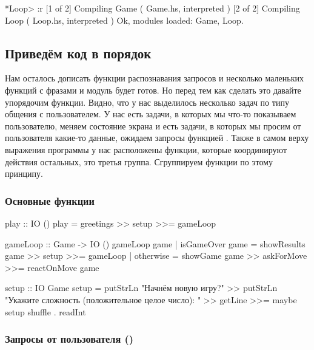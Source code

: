 \begin{code}
*Loop> :r
[1 of 2] Compiling Game             ( Game.hs, interpreted )
[2 of 2] Compiling Loop             ( Loop.hs, interpreted )
Ok, modules loaded: Game, Loop.
\end{code}

\subsection{Приведём код в порядок}

Нам осталось дописать функции распознавания запросов и несколько
маленьких функций с фразами и модуль  будет готов. Но перед тем
как сделать это давайте упорядочим функции. Видно, что у нас выделилось
несколько задач по типу общения с пользователем. У нас есть задачи, в
которых мы что-то показываем пользователю, меняем состояние экрана и
есть задачи, в которых мы просим от пользователя какие-то данные,
ожидаем запросы функцией . Также в самом верху выражения
программы у нас расположены функции, которые координируют действия
остальных, это третья группа. Сгруппируем функции по этому принципу.

\subsubsection{Основные функции}


\begin{code}
play :: IO ()
play = greetings >> setup >>= gameLoop

gameLoop :: Game -> IO ()
gameLoop game 
    | isGameOver game   = showResults game >> setup >>= gameLoop
    | otherwise         = showGame game >> askForMove >>= reactOnMove game

setup :: IO Game
setup = putStrLn "Начнём новую игру?" >>
    putStrLn "Укажите сложность (положительное целое число): " >>
    getLine >>= maybe setup shuffle . readInt 
\end{code}

\subsubsection{Запросы от пользователя ()}



